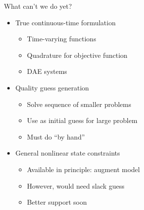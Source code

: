 \documentclass[xcolor=dvipsnames]{beamer}
\begin{document}
\begin{frame}{What can't we do yet?}
    \begin{itemize}
        \item True continuous-time formulation
        \begin{itemize}
            \item Time-varying functions
            \item Quadrature for objective function
            \item DAE systems
        \end{itemize}
        \item Quality guess generation
        \begin{itemize}
            \item Solve sequence of smaller problems
            \item Use as initial guess for large problem
            \item Must do ``by hand''
        \end{itemize}
        \item General nonlinear state constraints
        \begin{itemize}
            \item Available in principle: augment model
            \item However, would need slack guess
            \item Better support soon
        \end{itemize}
    \end{itemize}
\end{frame}
\end{document}
